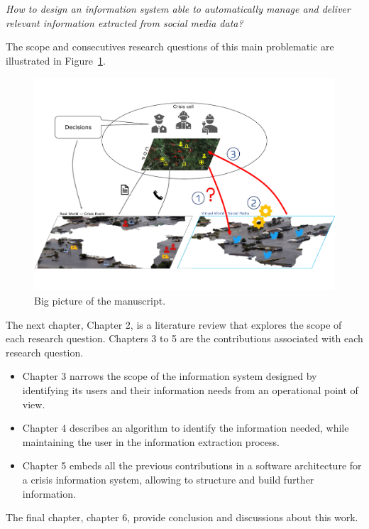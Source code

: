 \emph{How to design an information system able to automatically manage and deliver relevant information extracted from social media data?}

The scope and consecutives research questions of this main problematic are illustrated in Figure~\ref{context:big-picture}.

\begin{landscape}
    \begin{figure}
        \includegraphics[width=\paperwidth,height=\paperheight,keepaspectratio]{figures/big-picture.pdf}
        \caption{Big picture of the manuscript.}
        \label{context:big-picture}
    \end{figure}
\end{landscape}

The next chapter, Chapter 2, is a literature review that explores the scope of each research question.
Chapters 3 to 5 are the contributions associated with each research question.

\begin{itemize}
    \item Chapter 3 narrows the scope of the information system designed by identifying its users and their information needs from an operational point of view.
    \item Chapter 4 describes an algorithm to identify the information needed, while maintaining the user in the information extraction process.
    \item Chapter 5 embeds all the previous contributions in a software architecture for a crisis information system, allowing to structure and build further information.
\end{itemize}

The final chapter, chapter 6, provide conclusion and discussions about this work.

